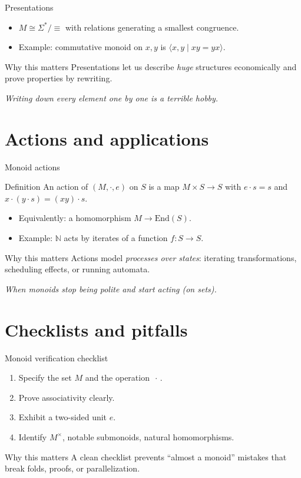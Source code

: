 \documentclass[aspectratio=169,11pt]{beamer}
\newcommand{\NN}{\mathbb{N}}
\newcommand{\End}{\mathrm{End}}
\newcommand{\tline}[1]{\par\medskip\textcolor{transit}{\emph{#1}}\par\medskip}
\begin{document}
\begin{frame}{Presentations}
\begin{itemize}
  \item $M\cong \Sigma^\ast/\!\!\equiv$ with relations generating a smallest congruence.
  \item Example: commutative monoid on $x,y$ is $\langle x,y\mid xy=yx\rangle$.
\end{itemize}
\begin{alertblock}{Why this matters}
Presentations let us describe \emph{huge} structures economically and prove properties by rewriting.
\end{alertblock}
\tline{Writing down every element one by one is a terrible hobby.}
\end{frame}

\section{Actions and applications}
\begin{frame}{Monoid actions}
\begin{block}{Definition}
An action of $(M,\cdot,e)$ on $S$ is a map $M\times S\to S$ with $e\cdot s=s$ and $x\cdot(y\cdot s)=(xy)\cdot s$.
\end{block}
\begin{itemize}
  \item Equivalently: a homomorphism $M\to\End(S)$.
  \item Example: $\NN$ acts by iterates of a function $f:S\to S$.
\end{itemize}
\begin{alertblock}{Why this matters}
Actions model \emph{processes over states}: iterating transformations, scheduling effects, or running automata.
\end{alertblock}
\tline{When monoids stop being polite and start acting (on sets).}
\end{frame}

\section{Checklists and pitfalls}
\begin{frame}{Monoid verification checklist}
\begin{enumerate}
  \item Specify the set $M$ and the operation $\,\cdot\,$.
  \item Prove associativity clearly.
  \item Exhibit a two-sided unit $e$.
  \item Identify $M^\times$, notable submonoids, natural homomorphisms.
\end{enumerate}
\begin{alertblock}{Why this matters}
A clean checklist prevents “almost a monoid” mistakes that break folds, proofs, or parallelization.
\end{alertblock}
\end{frame}
\end{document}
